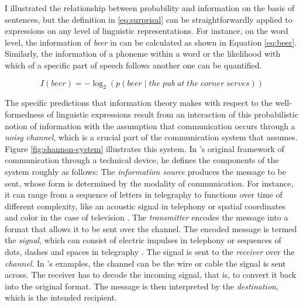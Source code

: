 I illustrated the relationship between probability and information on the basis of sentences, but the definition in \ref{eq:surprisal} can be straightforwardly applied to expressions on any level of linguistic representations. For instance, on the word level, the information of \textit{beer} in \Last[a] can be calculated as shown in Equation \ref{eq:beer}. Similarly, the information of a phoneme within a word or the likelihood with which  of a specific part of speech follows another one can be quantified.

\begin{equation}
 I(beer) = - \log_2 \left( p(beer\mathbin{|}the\; pub\; at\; the\; corner\; serves) \right)\label{eq:beer}
\end{equation}

The specific predictions that information theory makes with respect to the well-formedness of linguistic expressions result from an interaction of this probabilistic notion of information with the assumption that communication occurs through a \textit{noisy channel}, which is a crucial part of the communication system that \citet{shannon1948} assumes. Figure \ref{fig:shannon-cystem} illustrates this system. In \citeauthor{shannon1948}'s original framework of communication through a technical device, he defines the components of the system roughly as follows: The \textit{information source} produces the message to be sent, whose form is determined by the modality of communication. For instance, it can range from a sequence of letters in telegraphy to functions over time of different complexity, like an acoustic signal in telephony or spatial coordinates and color in the case of television \citep[380--381]{shannon1948}. The \textit{transmitter} encodes the message into a format that allows it to be sent over the channel. The encoded message is termed the \textit{signal}, which can consist of electric impulses in telephony or sequences of dots, dashes and spaces in telegraphy \citep[382]{shannon1948}. The signal is sent to the \textit{receiver} over the \textit{channel}. In \citeauthor{shannon1948}'s examples, the channel can be the wire or cable the signal is sent across. The receiver has to decode the incoming signal, that is, to convert it back into the original format. The message is then interpreted by the \textit{destination}, which is the intended recipient.

